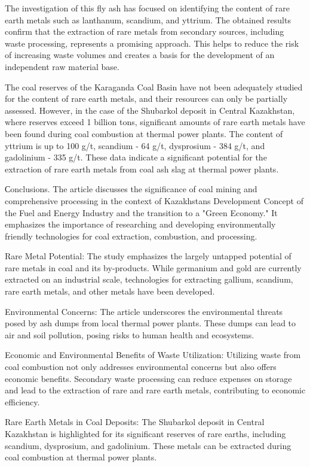 \begin{multicols}{2}
The investigation of this fly ash has focused on identifying the content
of rare earth metals such as lanthanum, scandium, and yttrium. The
obtained results confirm that the extraction of rare metals from
secondary sources, including waste processing, represents a promising
approach. This helps to reduce the risk of increasing waste volumes and
creates a basis for the development of an independent raw material base.

The coal reserves of the Karaganda Coal Basin have not been adequately
studied for the content of rare earth metals, and their resources can
only be partially assessed. However, in the case of the Shubarkol
deposit in Central Kazakhstan, where reserves exceed 1 billion tons,
significant amounts of rare earth metals have been found during coal
combustion at thermal power plants. The content of yttrium is up to 100
g/t, scandium - 64 g/t, dysprosium - 384 g/t, and gadolinium - 335 g/t.
These data indicate a significant potential for the extraction of rare
earth metals from coal ash slag at thermal power plants.

Сonclusions. The article discusses the significance of coal mining and
comprehensive processing in the context of Kazakhstan\textquotesingle s
Development Concept of the Fuel and Energy Industry and the transition
to a "Green Economy." It emphasizes the importance of researching and
developing environmentally friendly technologies for coal extraction,
combustion, and processing.

Rare Metal Potential: The study emphasizes the largely untapped
potential of rare metals in coal and its by-products. While germanium
and gold are currently extracted on an industrial scale, technologies
for extracting gallium, scandium, rare earth metals, and other metals
have been developed.

Environmental Concerns: The article underscores the environmental
threats posed by ash dumps from local thermal power plants. These dumps
can lead to air and soil pollution, posing risks to human health and
ecosystems.

Economic and Environmental Benefits of Waste Utilization: Utilizing
waste from coal combustion not only addresses environmental concerns but
also offers economic benefits. Secondary waste processing can reduce
expenses on storage and lead to the extraction of rare and rare earth
metals, contributing to economic efficiency.

Rare Earth Metals in Coal Deposits: The Shubarkol deposit in Central
Kazakhstan is highlighted for its significant reserves of rare earths,
including scandium, dysprosium, and gadolinium. These metals can be
extracted during coal combustion at thermal power plants.


\end{multicols}
